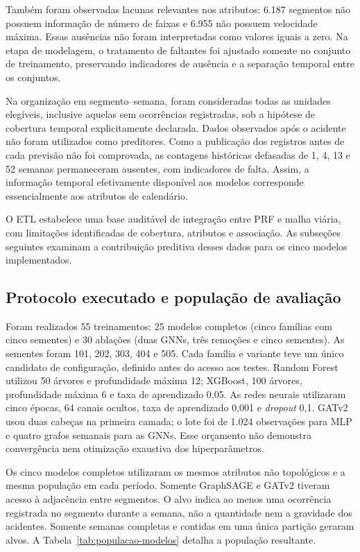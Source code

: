 \documentclass[12pt]{article}
\begin{document}
Também foram observadas lacunas relevantes nos atributos: 6.187
segmentos não possuem informação de número de faixas e 6.955 não possuem
velocidade máxima. Essas ausências não foram interpretadas como valores
iguais a zero. Na etapa de modelagem, o tratamento de faltantes foi
ajustado somente no conjunto de treinamento, preservando indicadores
de ausência e a separação temporal entre os conjuntos.

Na organização em segmento--semana, foram consideradas todas as
unidades elegíveis, inclusive aquelas sem ocorrências registradas,
sob a hipótese de cobertura temporal explicitamente declarada.
Dados observados após o acidente não foram utilizados como preditores.
Como a publicação dos registros antes de cada previsão não foi
comprovada, as contagens históricas defasadas de 1, 4, 13 e 52 semanas
permaneceram ausentes, com indicadores de falta. Assim, a informação
temporal efetivamente disponível aos modelos corresponde
essencialmente aos atributos de calendário.

O ETL estabelece uma base auditável de integração entre PRF e malha
viária, com limitações identificadas de cobertura, atributos e
associação. As subseções seguintes examinam a contribuição preditiva
desses dados para os cinco modelos implementados.

\subsection{Protocolo executado e população de avaliação}

Foram realizados 55 treinamentos: 25 modelos completos (cinco famílias
com cinco sementes) e 30 ablações (duas GNNs, três remoções e cinco
sementes). As sementes foram 101, 202, 303, 404 e 505. Cada família e
variante teve um único candidato de configuração, definido antes do
acesso aos testes. Random Forest utilizou 50 árvores e profundidade
máxima 12; XGBoost, 100 árvores, profundidade máxima 6 e taxa de
aprendizado 0,05. As redes neurais utilizaram cinco épocas, 64 canais
ocultos, taxa de aprendizado 0,001 e \textit{dropout} 0,1. GATv2 usou
duas cabeças na primeira camada; o lote foi de 1.024 observações para
MLP e quatro grafos semanais para as GNNs. Esse orçamento não demonstra
convergência nem otimização exaustiva dos hiperparâmetros.

Os cinco modelos completos utilizaram os mesmos atributos não
topológicos e a mesma população em cada período. Somente GraphSAGE e
GATv2 tiveram acesso à adjacência entre segmentos. O alvo indica ao menos uma
ocorrência registrada no segmento durante a semana, não a quantidade
nem a gravidade dos acidentes. Somente semanas completas e contidas em
uma única partição geraram alvos. A Tabela~\ref{tab:populacao-modelos}
detalha a população resultante.
\end{document}
